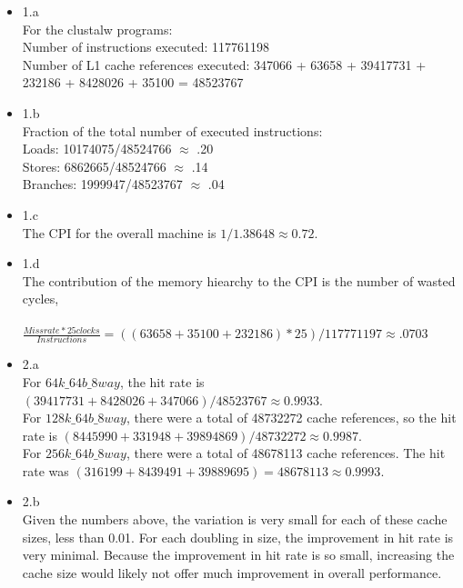 \documentclass[a4paper]{article}
\begin{document}
\begin{itemize}

\item{1.a} \\
For the clustalw programs: \\
Number of instructions executed: 117761198 \\
Number of L1 cache references executed:  347066 + 63658 + 39417731 + 232186 + 8428026 + 35100 = 48523767 \\


\item{1.b} \\
Fraction of the total number of executed instructions: \\ 
Loads: 10174075/48524766 $\approx$ .20 \\
Stores: 6862665/48524766 $\approx$ .14 \\
Branches: 1999947/48523767 $\approx$ .04 \\


\item{1.c} \\
The CPI for the overall machine is $1/1.38648 \approx 0.72$. \\


\item{1.d} \\
The contribution of the memory hiearchy to the CPI is the number of wasted cycles, \\
\\
$\frac{Miss rate * 25 clocks}{Instructions} = ((63658+35100+232186) * 25)/117771197 \approx .0703$ \\


\item{2.a} \\
For $64k\_64b\_8way$, the hit rate is $(39417731 + 8428026 + 347066)/48523767 \approx 0.9933$. \\ 

For $128k\_64b\_8way$, there were a total of 48732272 cache references, so the hit rate is $(8445990 + 331948 + 39894869)/48732272 \approx 0.9987$. \\

For $256k\_64b\_8way$, there were a total of 48678113 cache references.
The hit rate was $(316199 + 8439491 + 39889695)=48678113 \approx 0.9993$. \\


\item{2.b} \\
Given the numbers above, the variation is very small for each of these cache sizes, less than 0.01. For each doubling in size, the improvement in hit rate is very minimal. Because the improvement in hit rate is so small, increasing the cache size would likely not offer much improvement in overall performance. \\



\end{itemize}
\end{document}
